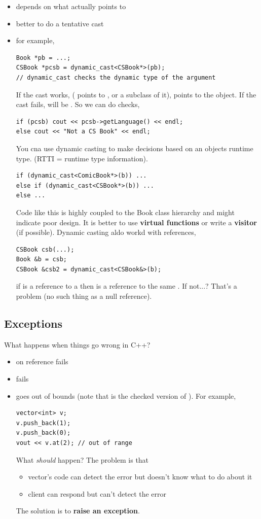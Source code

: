 \documentclass[english, 11pt]{article}
\begin{document}
\begin{itemize}
  \begin{itemize}
    \item depends on what  actually points to
    \item better to do a tentative cast
    \item for example,
    \begin{lstlisting}
Book *pb = ...;
CSBook *pcsb = dynamic_cast<CSBook*>(pb);
// dynamic_cast checks the dynamic type of the argument
    \end{lstlisting}
    If the cast works, ( points to , or a subclass of it),  points to the object. If the cast fails,  will be . So we can do checks,
    \begin{lstlisting}
if (pcsb) cout << pcsb->getLanguage() << endl;
else cout << "Not a CS Book" << endl;
    \end{lstlisting}
    You cna use dynamic casting to make decisions based on an objects runtime type. (RTTI = runtime type information).
    \begin{lstlisting}
if (dynamic_cast<ComicBook*>(b)) ...
else if (dynamic_cast<CSBook*>(b)) ...
else ...
    \end{lstlisting}
    Code like this is highly coupled to the Book class hierarchy and might indicate poor design. It is better to use \textbf{virtual functions} or write a \textbf{visitor} (if possible). Dynamic casting aldo workd with references,
    \begin{lstlisting}
CSBook csb(...);
Book &b = csb;
CSBook &csb2 = dynamic_cast<CSBook&>(b);
    \end{lstlisting}
    if  is a reference to a  then  is a reference to the same . If not...? That's a problem (no such thing as a null reference).
  \end{itemize}
\end{itemize}

\subsection{Exceptions}
What happens when things go wrong in C++?
\begin{itemize}
  \item {} on reference fails
  \item {} fails
  \item {} goes out of bounds (note that  is the checked version of ). For example,
  \begin{lstlisting}
vector<int> v;
v.push_back(1);
v.push_back(0);
vout << v.at(2); // out of range
  \end{lstlisting}
  What \textit{should} happen? The problem is that
  \begin{itemize}
    \item vector's code can detect the error but doesn't know what to do about it
    \item client can respond but can't detect the error
  \end{itemize}
  The solution is to \textbf{raise an exception}.
\end{itemize}
\end{document}
